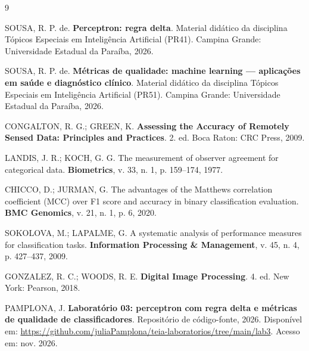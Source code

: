 \documentclass[12pt,a4paper]{article}
\newcommand{\repositorio}{\url{https://github.com/juliaPamplona/teia-laboratorios/tree/main/lab3}}
\begin{document}
\begin{thebibliography}{9}

SOUSA, R. P. de. \textbf{Perceptron: regra delta}. Material didático da disciplina Tópicos Especiais em Inteligência Artificial (PR41). Campina Grande: Universidade Estadual da Paraíba, 2026.

SOUSA, R. P. de. \textbf{Métricas de qualidade: machine learning --- aplicações em saúde e diagnóstico clínico}. Material didático da disciplina Tópicos Especiais em Inteligência Artificial (PR51). Campina Grande: Universidade Estadual da Paraíba, 2026.

CONGALTON, R. G.; GREEN, K. \textbf{Assessing the Accuracy of Remotely Sensed Data: Principles and Practices}. 2. ed. Boca Raton: CRC Press, 2009.

LANDIS, J. R.; KOCH, G. G. The measurement of observer agreement for categorical data. \textbf{Biometrics}, v. 33, n. 1, p. 159--174, 1977.

CHICCO, D.; JURMAN, G. The advantages of the Matthews correlation coefficient (MCC) over F1 score and accuracy in binary classification evaluation. \textbf{BMC Genomics}, v. 21, n. 1, p. 6, 2020.

SOKOLOVA, M.; LAPALME, G. A systematic analysis of performance measures for classification tasks. \textbf{Information Processing \& Management}, v. 45, n. 4, p. 427--437, 2009.

GONZALEZ, R. C.; WOODS, R. E. \textbf{Digital Image Processing}. 4. ed. New York: Pearson, 2018.

PAMPLONA, J. \textbf{Laboratório 03: perceptron com regra delta e métricas de qualidade de classificadores}. Repositório de código-fonte, 2026. Disponível em: \repositorio. Acesso em: nov. 2026.

\end{thebibliography}
\end{document}
